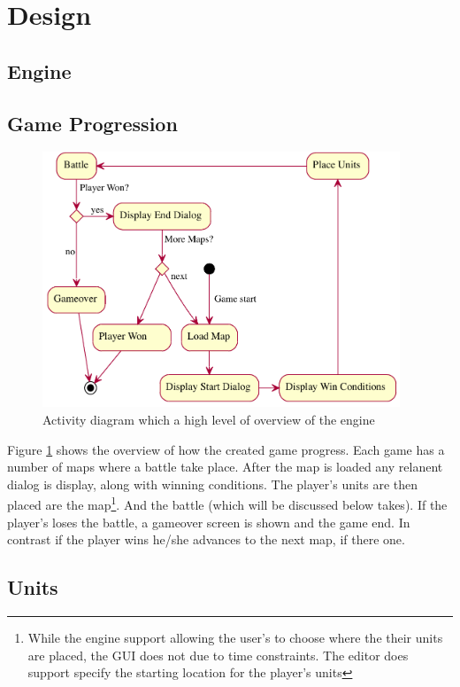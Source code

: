 \section{Design}

\subsection{Engine}


\subsection{Game Progression}
\begin{figure}[htbp]
	\centering
		\includegraphics[height=3in]{figures/game.pdf}
	\caption{Activity diagram which a high level of overview of the engine}
	\label{fig:figures_game}
\end{figure}

Figure \ref{fig:figures_game} shows the overview of how the created game progress.  Each game has a number of maps where a battle take place. After the map is loaded any relanent dialog is display, along with winning conditions. The player's units are then placed are the map\footnote{While the engine support allowing the user's to choose where the their units are placed, the GUI does not due to time constraints. The editor does support specify the starting location for the player's units}.  And the battle (which will be discussed below takes). If the player's loses the battle, a gameover screen is shown and the game end. In contrast if the player wins he/she advances to the next map, if there one.    

\subsection{Units}

